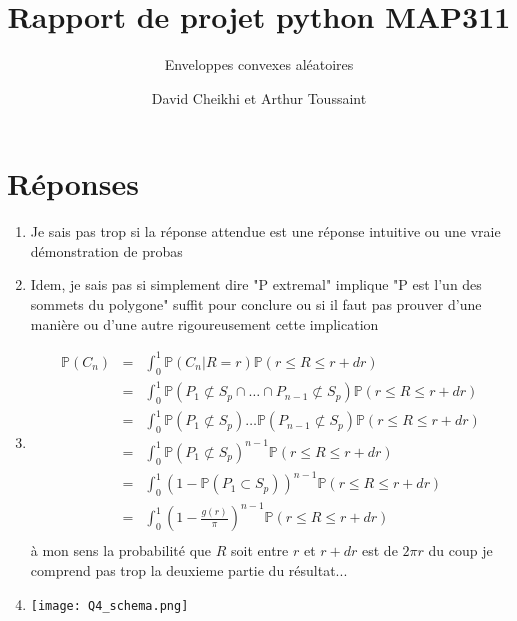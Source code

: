 \documentclass[a4paper,12pt,twoside]{article}
\title{Rapport de projet python MAP311}
\subtitle{Enveloppes convexes aléatoires}
\author{David Cheikhi et Arthur Toussaint}
\newcommand{\p}{\mathbb{P}}
\begin{document}
\maketitle

\section*{Réponses}
	\begin{enumerate}
		\item Je sais pas trop si la réponse attendue est une réponse intuitive ou une vraie démonstration de probas
		\item Idem, je sais pas si simplement dire "P extremal" implique "P est l'un des sommets du polygone" suffit pour conclure ou si il faut pas prouver d'une manière ou d'une autre rigoureusement cette implication
		\item \begin{eqnarray}
			\p(C_n) &=& \int_0^1{\p(C_n | R = r) \p(r\leq R \leq r + dr)} \\
				&=& \int_0^1{\p(P_1 \not\subset S_p \cap \ldots \cap P_{n-1} \not\subset S_p)\p(r\leq R \leq r + dr)} \\
				&=& \int_0^1{\p(P_1 \not\subset S_p) \ldots \p(P_{n-1} \not\subset S_p)\p(r\leq R \leq r + dr)} \\
				&=& \int_0^1{\p(P_1 \not\subset S_p)^{n-1}\p(r\leq R \leq r + dr)} \\
				&=& \int_0^1{(1 - \p(P_1 \subset S_p))^{n-1}\p(r\leq R \leq r + dr)} \\
				&=& \int_0^1{\left( 1 - \frac{g(r)}{\pi}\right) ^{n-1}\p(r\leq R \leq r + dr)} \\
		\end{eqnarray}
		à mon sens la probabilité que $R$ soit entre $r$ et $r + dr$ est de $2\pi r$ du coup je comprend pas trop la deuxieme partie du résultat...
		\item \texttt{[image: Q4\_schema.png]}
		\end{enumerate}
\end{document}
